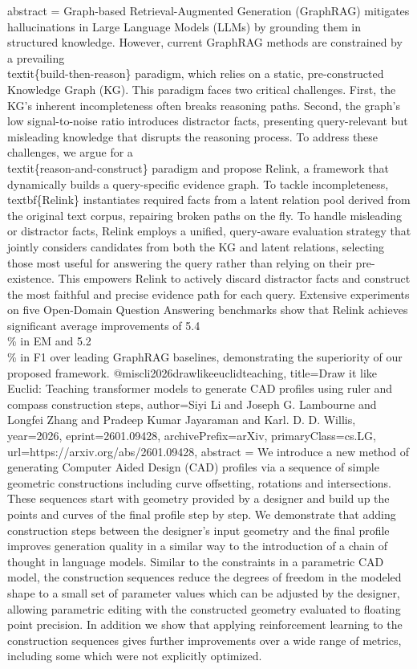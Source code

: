 {      abstract = {Graph-based Retrieval-Augmented Generation (GraphRAG) mitigates hallucinations in Large Language Models (LLMs) by grounding them in structured knowledge. However, current GraphRAG methods are constrained by a prevailing \\textit\{build-then-reason\} paradigm, which relies on a static, pre-constructed Knowledge Graph (KG). This paradigm faces two critical challenges. First, the KG's inherent incompleteness often breaks reasoning paths. Second, the graph's low signal-to-noise ratio introduces distractor facts, presenting query-relevant but misleading knowledge that disrupts the reasoning process.   To address these challenges, we argue for a \\textit\{reason-and-construct\} paradigm and propose Relink, a framework that dynamically builds a query-specific evidence graph. To tackle incompleteness, \\textbf\{Relink\} instantiates required facts from a latent relation pool derived from the original text corpus, repairing broken paths on the fly. To handle misleading or distractor facts, Relink employs a unified, query-aware evaluation strategy that jointly considers candidates from both the KG and latent relations, selecting those most useful for answering the query rather than relying on their pre-existence. This empowers Relink to actively discard distractor facts and construct the most faithful and precise evidence path for each query.   Extensive experiments on five Open-Domain Question Answering benchmarks show that Relink achieves significant average improvements of 5.4\\\% in EM and 5.2\\\% in F1 over leading GraphRAG baselines, demonstrating the superiority of our proposed framework.}
}@misc{li2026drawlikeeuclidteaching,
      title={Draw it like Euclid: Teaching transformer models to generate CAD profiles using ruler and compass construction steps}, 
      author={Siyi Li and Joseph G. Lambourne and Longfei Zhang and Pradeep Kumar Jayaraman and Karl. D. D. Willis},
      year={2026},
      eprint={2601.09428},
      archivePrefix={arXiv},
      primaryClass={cs.LG},
      url={https://arxiv.org/abs/2601.09428},
      abstract = {We introduce a new method of generating Computer Aided Design (CAD) profiles via a sequence of simple geometric constructions including curve offsetting, rotations and intersections. These sequences start with geometry provided by a designer and build up the points and curves of the final profile step by step. We demonstrate that adding construction steps between the designer's input geometry and the final profile improves generation quality in a similar way to the introduction of a chain of thought in language models. Similar to the constraints in a parametric CAD model, the construction sequences reduce the degrees of freedom in the modeled shape to a small set of parameter values which can be adjusted by the designer, allowing parametric editing with the constructed geometry evaluated to floating point precision. In addition we show that applying reinforcement learning to the construction sequences gives further improvements over a wide range of metrics, including some which were not explicitly optimized.}
}
